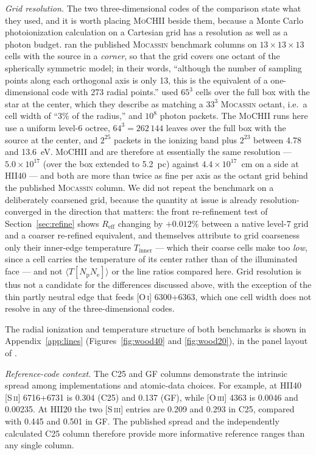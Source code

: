\documentclass[twocolumn,linenumbers]{aastex702}
\newcommand{\MoCHII}{\textsc{MoCHII}}
\begin{document}
\emph{Grid resolution.}  The two three-dimensional codes of the comparison
state what they used, and it is worth placing \MoCHII{} beside them, because
a Monte Carlo photoionization calculation on a Cartesian grid has a
resolution as well as a photon budget.  \citet{ercolano2003} ran the
published \textsc{Mocassin} benchmark columns on $13\times13\times13$ cells
with the source in a \emph{corner}, so that the grid covers one octant of the
spherically symmetric model; in their words, ``although the number of
sampling points along each orthogonal axis is only 13, this is the
equivalent of a one-dimensional code with 273 radial points.''
\citet{wood2004} used $65^3$ cells over the full box with the star at the
center, which they describe as matching a $33^3$ \textsc{Mocassin} octant,
i.e.\ a cell width of ``3\% of the radius,'' and $10^8$ photon packets.  The
\MoCHII{} runs here use a uniform level-6 octree, $64^3 = 262\,144$ leaves
over the full box with the source at the center, and $2^{25}$ packets
in the ionizing band plus $2^{23}$ between 4.78 and 13.6~eV.
\MoCHII{} and \citet{wood2004} are therefore at essentially the same
resolution --- $5.0\times10^{17}$ (over the box extended to 5.2~pc) against
$4.4\times10^{17}$~cm on a side at HII40 --- and both are more than twice as
fine per axis as the octant grid behind the published \textsc{Mocassin}
column.  We did not repeat the
benchmark on a deliberately coarsened grid, because the quantity at issue is
already resolution-converged in the direction that matters: the front
re-refinement test of Section~\ref{sec:refine} shows $R_{\mathrm{eff}}$
changing by $+0.012\%$ between a native level-7 grid and a coarser
re-refined equivalent, and \citet{ercolano2003} themselves attribute to grid
coarseness only their inner-edge temperature $T_{\mathrm{inner}}$ --- which
their coarse cells make too \emph{low}, since a cell carries the temperature
of its center rather than of the illuminated face --- and not
$\langle T[N_{\mathrm{p}}N_{\mathrm{e}}]\rangle$ or the line ratios compared
here.  Grid resolution is thus not a candidate for the differences discussed
above, with the exception of the thin partly neutral edge that feeds
[O\,\textsc{i}] 6300+6363, which one cell width does not resolve in any of
the three-dimensional codes.

The radial ionization and temperature structure of both benchmarks is
shown in Appendix~\ref{app:lines} (Figures~\ref{fig:wood40} and
\ref{fig:wood20}), in the panel layout of \citet{wood2004}.


\emph{Reference-code context.}  The C25 and GF columns demonstrate the
intrinsic spread among implementations and atomic-data choices.  For example,
at HII40 [S\,\textsc{ii}] 6716+6731 is 0.304 (C25) and 0.137 (GF), while
[O\,\textsc{iii}] 4363 is 0.0046 and 0.00235.  At HII20 the two
[S\,\textsc{iii}] entries are 0.209 and 0.293 in C25, compared with 0.445
and 0.501 in GF.  The published spread and the independently calculated C25
column therefore provide more informative reference ranges than any single
column.
\end{document}
